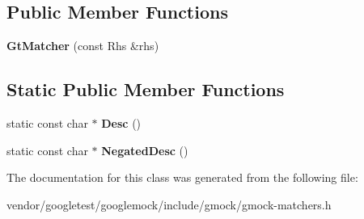 \subsection*{Public Member Functions}
\begin{DoxyCompactItemize}
\item 
{\bfseries Gt\+Matcher} (const Rhs \&rhs)\hypertarget{classtesting_1_1internal_1_1GtMatcher_aeef0f6dd7c57a2ed0f379d8100de0215}{}\label{classtesting_1_1internal_1_1GtMatcher_aeef0f6dd7c57a2ed0f379d8100de0215}

\end{DoxyCompactItemize}
\subsection*{Static Public Member Functions}
\begin{DoxyCompactItemize}
\item 
static const char $\ast$ {\bfseries Desc} ()\hypertarget{classtesting_1_1internal_1_1GtMatcher_ac4e664e328e4400e1cecc9b804de6937}{}\label{classtesting_1_1internal_1_1GtMatcher_ac4e664e328e4400e1cecc9b804de6937}

\item 
static const char $\ast$ {\bfseries Negated\+Desc} ()\hypertarget{classtesting_1_1internal_1_1GtMatcher_ace1dc02e105fd93b638f23433bf682a4}{}\label{classtesting_1_1internal_1_1GtMatcher_ace1dc02e105fd93b638f23433bf682a4}

\end{DoxyCompactItemize}


The documentation for this class was generated from the following file\+:\begin{DoxyCompactItemize}
\item 
vendor/googletest/googlemock/include/gmock/gmock-\/matchers.\+h\end{DoxyCompactItemize}
